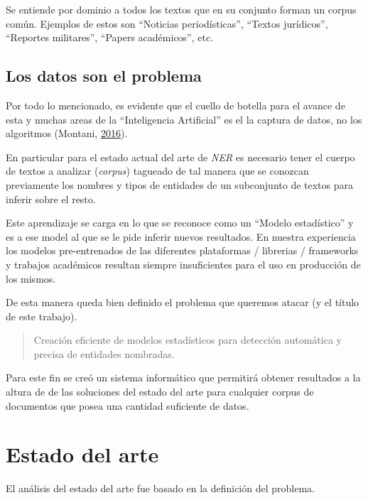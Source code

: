 \documentclass[12pt,a4paper,]{scrartcl}
\begin{document}
Se entiende por dominio a todos los textos que en su conjunto forman un corpus común. Ejemplos de estos son \enquote{Noticias periodísticas}, \enquote{Textos jurídicos}, \enquote{Reportes militares}, \enquote{Papers académicos}, etc.

\hypertarget{los-datos-son-el-problema}{%
\subsection{Los datos son el problema}\label{los-datos-son-el-problema}}

Por todo lo mencionado, es evidente que el cuello de botella para el avance de esta y muchas areas de la \enquote{Inteligencia Artificial} es el la captura de datos, no los algoritmos (Montani, \protect\hyperlink{ref-montani_AI}{2016}).

En particular para el estado actual del arte de \emph{NER} es necesario tener el cuerpo de textos a analizar (\emph{corpus}) tagueado de tal manera que se conozcan previamente los nombres y tipos de entidades de un subconjunto de textos para inferir sobre el resto.

Este aprendizaje se carga en lo que se reconoce como un \enquote{Modelo estadístico} y es a ese model al que se le pide inferir nuevos resultados. En nuestra experiencia los modelos pre-entrenados de las diferentes plataformas / librerias / frameworks y trabajos académicos resultan siempre insuficientes para el uso en producción de los mismos.

De esta manera queda bien definido el problema que queremos atacar (y el título de este trabajo).

\begin{quote}
Creación eficiente de modelos estadísticos para detección automática y precisa de entidades nombradas.
\end{quote}

Para este fin se creó un sistema informático que permitirá obtener resultados a la altura de de las soluciones del estado del arte para cualquier corpus de documentos que posea una cantidad suficiente de datos.

\newpage

\hypertarget{state-of-art}{%
\section{Estado del arte}\label{state-of-art}}

El análisis del estado del arte fue basado en la definición del problema.
\end{document}
